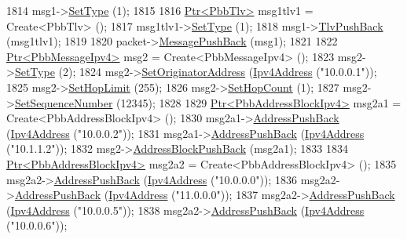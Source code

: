 \begin{DoxyCode}
1814     msg1->\hyperlink{classns3_1_1PbbMessage_a4b3d1eaabd3e7412a46ac79bf3360dac}{SetType} (1);
1815 
1816     \hyperlink{classns3_1_1Ptr}{Ptr<PbbTlv>} msg1tlv1 = Create<PbbTlv> ();
1817     msg1tlv1->\hyperlink{classns3_1_1PbbTlv_a90a0452018ed364ac37c3ad116dd718b}{SetType} (1);
1818     msg1->\hyperlink{classns3_1_1PbbMessage_aac70b2672f79765cf5cc5b6666018165}{TlvPushBack} (msg1tlv1);
1819 
1820     packet->\hyperlink{classns3_1_1PbbPacket_a4a3170001ef758d9c9c4375b8f089826}{MessagePushBack} (msg1);
1821 
1822     \hyperlink{classns3_1_1Ptr}{Ptr<PbbMessageIpv4>} msg2 = Create<PbbMessageIpv4> ();
1823     msg2->\hyperlink{classns3_1_1PbbMessage_a4b3d1eaabd3e7412a46ac79bf3360dac}{SetType} (2);
1824     msg2->\hyperlink{classns3_1_1PbbMessage_a52ac135a2bec53db5e8f46b8b8a25e7c}{SetOriginatorAddress} (\hyperlink{classns3_1_1Ipv4Address}{Ipv4Address} (\textcolor{stringliteral}{"10.0.0.1"}));
1825     msg2->\hyperlink{classns3_1_1PbbMessage_a532a7e5e135f7491f8a84ab1dfadd28f}{SetHopLimit} (255);
1826     msg2->\hyperlink{classns3_1_1PbbMessage_a882ec7e2e9a9dff6297152c196d54ce4}{SetHopCount} (1);
1827     msg2->\hyperlink{classns3_1_1PbbMessage_a8c24696ac67507afa03c9750daccc47d}{SetSequenceNumber} (12345);
1828 
1829     \hyperlink{classns3_1_1Ptr}{Ptr<PbbAddressBlockIpv4>} msg2a1 = Create<PbbAddressBlockIpv4> ();
1830     msg2a1->\hyperlink{classns3_1_1PbbAddressBlock_a7be545a53d69bd426dbebcf752ed8371}{AddressPushBack} (\hyperlink{classns3_1_1Ipv4Address}{Ipv4Address} (\textcolor{stringliteral}{"10.0.0.2"}));
1831     msg2a1->\hyperlink{classns3_1_1PbbAddressBlock_a7be545a53d69bd426dbebcf752ed8371}{AddressPushBack} (\hyperlink{classns3_1_1Ipv4Address}{Ipv4Address} (\textcolor{stringliteral}{"10.1.1.2"}));
1832     msg2->\hyperlink{classns3_1_1PbbMessage_a5f623bad2fb1adde7da885e1c92d5311}{AddressBlockPushBack} (msg2a1);
1833 
1834     \hyperlink{classns3_1_1Ptr}{Ptr<PbbAddressBlockIpv4>} msg2a2 = Create<PbbAddressBlockIpv4> ();
1835     msg2a2->\hyperlink{classns3_1_1PbbAddressBlock_a7be545a53d69bd426dbebcf752ed8371}{AddressPushBack} (\hyperlink{classns3_1_1Ipv4Address}{Ipv4Address} (\textcolor{stringliteral}{"10.0.0.0"}));
1836     msg2a2->\hyperlink{classns3_1_1PbbAddressBlock_a7be545a53d69bd426dbebcf752ed8371}{AddressPushBack} (\hyperlink{classns3_1_1Ipv4Address}{Ipv4Address} (\textcolor{stringliteral}{"11.0.0.0"}));
1837     msg2a2->\hyperlink{classns3_1_1PbbAddressBlock_a7be545a53d69bd426dbebcf752ed8371}{AddressPushBack} (\hyperlink{classns3_1_1Ipv4Address}{Ipv4Address} (\textcolor{stringliteral}{"10.0.0.5"}));
1838     msg2a2->\hyperlink{classns3_1_1PbbAddressBlock_a7be545a53d69bd426dbebcf752ed8371}{AddressPushBack} (\hyperlink{classns3_1_1Ipv4Address}{Ipv4Address} (\textcolor{stringliteral}{"10.0.0.6"}));

\end{DoxyCode}
